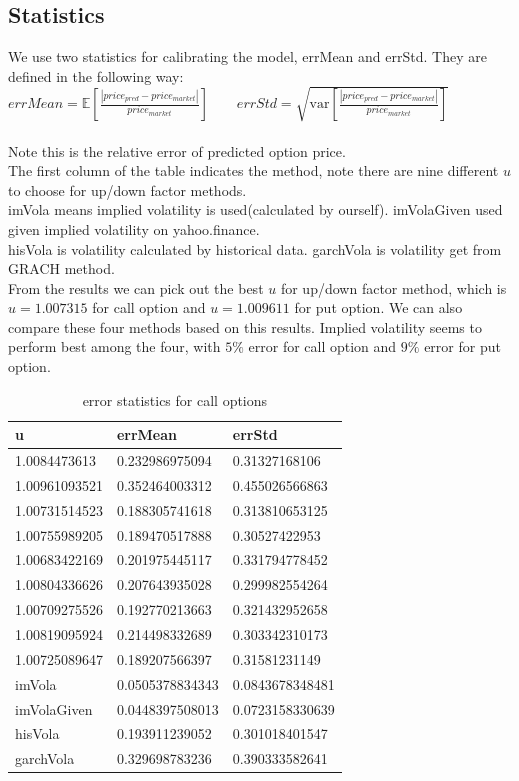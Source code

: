 \subsection{Statistics}
We use two statistics for calibrating the model, errMean and errStd.
They are defined in the following way:\\
$errMean =\mathbb{E}[\frac{|price_{pred} -price_{market}|}{price_{market}}] \quad \quad  errStd=\sqrt{\mathrm{var}[\frac{|price_{pred} -price_{market}|}{price_{market}}]}$\\
\\
Note this is the relative error of predicted option price.\\
The first column of the table indicates the method, note there are nine different $u$ to choose for up/down factor methods.  \\
imVola means implied volatility is used(calculated by ourself). imVolaGiven used given implied volatility on yahoo.finance.\\
hisVola is volatility calculated by historical data. garchVola is volatility get from GRACH method.\\
From the results we can pick out the best $u$ for up/down factor method, which is $u=1.007315$ for call option and $u=1.009611$ for put option.
We can also compare these four methods based on this results. Implied volatility seems to perform best among the four, with $5\%$ error for call option and $9\%$ error for put option.\\

\begin{table}[H]
\centering
\caption{error statistics for call options}
\label{errc}
\begin{tabular}{l|l|l}
\hline
\textbf{u}&\textbf{errMean}&\textbf{errStd}\\
\hline
1.0084473613&0.232986975094&0.31327168106\\
1.00961093521&0.352464003312&0.455026566863\\
1.00731514523&0.188305741618&0.313810653125\\
1.00755989205&0.189470517888&0.30527422953\\
1.00683422169&0.201975445117&0.331794778452\\
1.00804336626&0.207643935028&0.299982554264\\
1.00709275526&0.192770213663&0.321432952658\\
1.00819095924&0.214498332689&0.303342310173\\
1.00725089647&0.189207566397&0.31581231149\\
imVola&0.0505378834343&0.0843678348481\\
imVolaGiven&0.0448397508013&0.0723158330639\\
hisVola&0.193911239052&0.301018401547\\
garchVola&0.329698783236&0.390333582641\\
\hline
\end{tabular}
\end{table}\noindent

